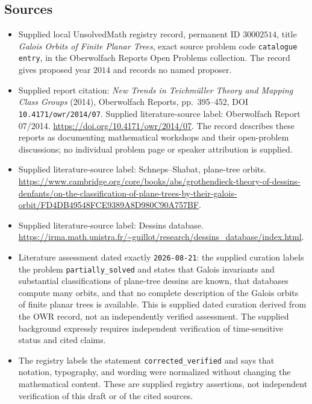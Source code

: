 \documentclass[11pt]{article}
\begin{document}
\subsection{Sources}
\begin{itemize}
\item Supplied local UnsolvedMath registry record, permanent ID \(30002514\), title \emph{Galois Orbits of Finite Planar Trees}, exact source problem code \texttt{catalogue entry}, in the Oberwolfach Reports Open Problems collection. The record gives proposed year \(2014\) and records no named proposer.
\item Supplied report citation: \emph{New Trends in Teichm\"uller Theory and Mapping Class Groups} (2014), Oberwolfach Reports, pp.~395--452, DOI \texttt{10.4171/owr/2014/07}. Supplied literature-source label: Oberwolfach Report 07/2014. \url{https://doi.org/10.4171/owr/2014/07}. The record describes these reports as documenting mathematical workshops and their open-problem discussions; no individual problem page or speaker attribution is supplied.
\item Supplied literature-source label: Schneps--Shabat, plane-tree orbits. \url{https://www.cambridge.org/core/books/abs/grothendieck-theory-of-dessins-denfants/on-the-classification-of-plane-trees-by-their-galois-orbit/FD4DB49548FCE9389A8D980C90A757BF}.
\item Supplied literature-source label: Dessins database. \url{https://irma.math.unistra.fr/~guillot/research/dessins_database/index.html}.
\item Literature assessment dated exactly \texttt{2026-08-21}: the supplied curation labels the problem \texttt{partially\_solved} and states that Galois invariants and substantial classifications of plane-tree dessins are known, that databases compute many orbits, and that no complete description of the Galois orbits of finite planar trees is available. This is supplied dated curation derived from the OWR record, not an independently verified assessment. The supplied background expressly requires independent verification of time-sensitive status and cited claims.
\item The registry labels the statement \texttt{corrected\_verified} and says that notation, typography, and wording were normalized without changing the mathematical content. These are supplied registry assertions, not independent verification of this draft or of the cited sources.
\end{itemize}
\end{document}
